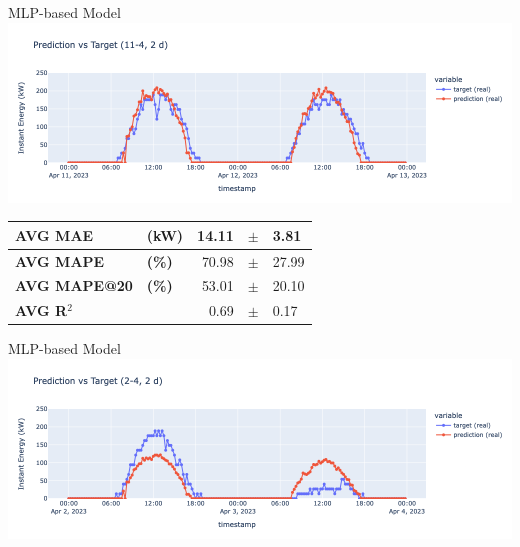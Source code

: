 \begin{frame}{MLP-based Model}
	\centering
	\includegraphics[width=\textwidth]{sections/5_eval/imgs/mlp/ufcpred11-4.png}
	\begin{table}[]
		\centering
		\begin{tabular}{ll|rcl}
			\textbf{AVG MAE}     & \textbf{(kW)} & 14.11 & $\pm$ & 3.81  \\
			\hline
			\textbf{AVG MAPE}    & \textbf{(\%)} & 70.98 & $\pm$ & 27.99 \\
			\hline
			\textbf{AVG MAPE@20} & \textbf{(\%)} & 53.01 & $\pm$ & 20.10 \\
			\hline
			\textbf{AVG R$^2$}   &               & 0.69  & $\pm$ & 0.17
		\end{tabular}
	\end{table}
\end{frame}

\begin{frame}{MLP-based Model}
	\includegraphics[width=\textwidth]{sections/5_eval/imgs/mlp/ufcpred2-4.png}
\end{frame}

